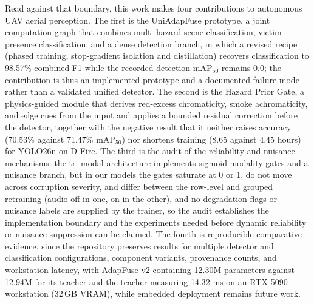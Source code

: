Read against that boundary, this work makes four contributions to autonomous UAV aerial perception. The first is the UniAdapFuse prototype, a joint computation graph that combines multi-hazard scene classification, victim-presence classification, and a dense detection branch, in which a revised recipe (phased training, stop-gradient isolation and distillation) recovers classification to 98.57\% combined F1 while the recorded detection $\mathrm{mAP}_{50}$ remains 0.0; the contribution is thus an implemented prototype and a documented failure mode rather than a validated unified detector. The second is the Hazard Prior Gate, a physics-guided module that derives red-excess chromaticity, smoke achromaticity, and edge cues from the input and applies a bounded residual correction before the detector, together with the negative result that it neither raises accuracy (70.53\% against 71.47\% $\mathrm{mAP}_{50}$) nor shortens training (8.65 against 4.45 hours) for YOLO26n on D-Fire. The third is the audit of the reliability and nuisance mechanisms: the tri-modal architecture implements sigmoid modality gates and a nuisance branch, but in our models the gates saturate at 0 or 1, do not move across corruption severity, and differ between the row-level and grouped retraining (audio off in one, on in the other), and no degradation flags or nuisance labels are supplied by the trainer, so the audit establishes the implementation boundary and the experiments needed before dynamic reliability or nuisance suppression can be claimed. The fourth is reproducible comparative evidence, since the repository preserves results for multiple detector and classification configurations, component variants, provenance counts, and workstation latency, with AdapFuse-v2 containing 12.30M parameters against 12.94M for its teacher and the teacher measuring 14.32 ms on an RTX 5090 workstation (32\,GB VRAM), while embedded deployment remains future work.

